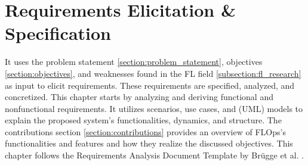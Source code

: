 \section{Requirements Elicitation \& Specification}

It uses the problem statement \ref{section:problem_statement}, objectives \ref{section:objectives}, and weaknesses found in the FL field \ref{subsection:fl_research} as input to elicit requirements.
These requirements are specified, analyzed, and concretized. 
This chapter starts by analyzing and deriving functional and nonfunctional requirements.
It utilizes scenarios, use cases, and (UML) models to explain the proposed system's functionalities, dynamics, and structure.
The contributions section \ref{section:contributions} provides an overview of FLOps's functionalities and features and how they realize the discussed objectives.
This chapter follows the Requirements Analysis Document Template by Brügge et al. \cite{book:bruegge}.




